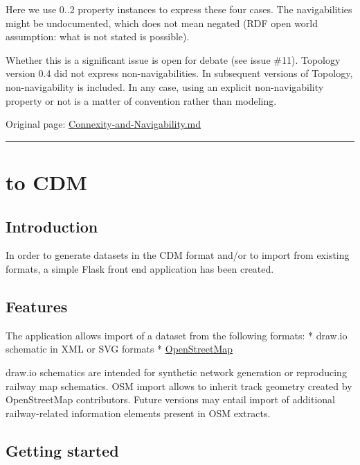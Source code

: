 \documentclass[
  11pt,
]{article}
\begin{document}
Here we use 0..2 property instances to express these four cases. The
navigabilities might be undocumented, which does not mean negated (RDF
open world assumption: what is not stated is possible).

Whether this is a significant issue is open for debate (see issue \#11).
Topology version 0.4 did not express non-navigabilities. In subsequent
versions of Topology, non-navigability is included. In any case, using
an explicit non-navigability property or not is a matter of convention
rather than modeling.

Original page:
\href{https://github.com/UICrail/CDM-RSM/wiki/Connexity-and-Navigability}{Connexity-and-Navigability.md}

\begin{center}\rule{0.5\linewidth}{0.5pt}\end{center}

\hypertarget{to-cdm}{%
\section{to CDM}\label{to-cdm}}

\hypertarget{introduction}{%
\subsection{Introduction}\label{introduction}}

In order to generate datasets in the CDM format and/or to import from
existing formats, a simple Flask front end application has been created.

\hypertarget{features}{%
\subsection{Features}\label{features}}

The application allows import of a dataset from the following formats: *
draw.io schematic in XML or SVG formats *
\href{https://www.openstreetmap.org/}{OpenStreetMap}

draw.io schematics are intended for synthetic network generation or
reproducing railway map schematics. OSM import allows to inherit track
geometry created by OpenStreetMap contributors. Future versions may
entail import of additional railway-related information elements present
in OSM extracts.

\hypertarget{getting-started}{%
\subsection{Getting started}\label{getting-started}}
\end{document}
